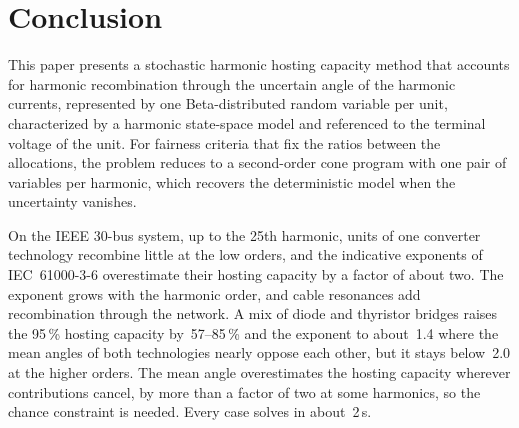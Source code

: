 \section{Conclusion}
\label{sec:conclusion}

This paper presents a stochastic harmonic hosting capacity method that accounts for harmonic recombination through the uncertain angle of the harmonic currents, represented by one Beta-distributed random variable per unit, characterized by a harmonic state-space model and referenced to the terminal voltage of the unit. For fairness criteria that fix the ratios between the allocations, the problem reduces to a second-order cone program with one pair of variables per harmonic, which recovers the deterministic model when the uncertainty vanishes.

On the IEEE 30-bus system, up to the 25th harmonic, units of one converter technology recombine little at the low orders, and the indicative exponents of IEC~61000-3-6 overestimate their hosting capacity by a factor of about two. The exponent grows with the harmonic order, and cable resonances add recombination through the network. A mix of diode and thyristor bridges raises the 95\,\% hosting capacity by~57--85\,\% and the exponent to about~1.4 where the mean angles of both technologies nearly oppose each other, but it stays below~2.0 at the higher orders. The mean angle overestimates the hosting capacity wherever contributions cancel, by more than a factor of two at some harmonics, so the chance constraint is needed. Every case solves in about~2\,s.

